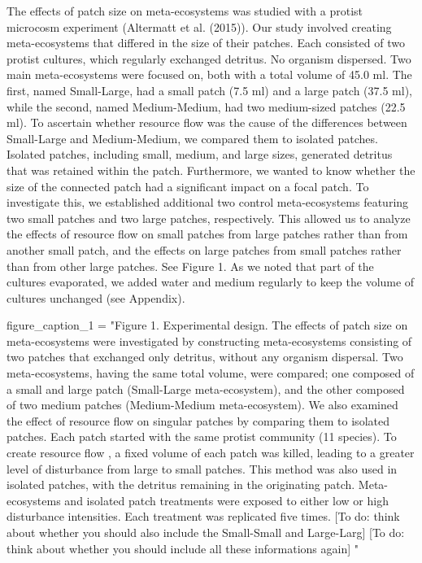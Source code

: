 \documentclass[
]{article}
\newenvironment{Shaded}{\begin{snugshade}}{\end{snugshade}}
\newcommand{\NormalTok}[1]{#1}
\newcommand{\OtherTok}[1]{\textcolor[rgb]{0.56,0.35,0.01}{#1}}
\newcommand{\StringTok}[1]{\textcolor[rgb]{0.31,0.60,0.02}{#1}}
\begin{document}
The effects of patch size on meta-ecosystems was studied with a protist
microcosm experiment (Altermatt et al. (2015)). Our study involved
creating meta-ecosystems that differed in the size of their patches.
Each consisted of two protist cultures, which regularly exchanged
detritus. No organism dispersed. Two main meta-ecosystems were focused
on, both with a total volume of 45.0 ml. The first, named Small-Large,
had a small patch (7.5 ml) and a large patch (37.5 ml), while the
second, named Medium-Medium, had two medium-sized patches (22.5 ml). To
ascertain whether resource flow was the cause of the differences between
Small-Large and Medium-Medium, we compared them to isolated patches.
Isolated patches, including small, medium, and large sizes, generated
detritus that was retained within the patch. Furthermore, we wanted to
know whether the size of the connected patch had a significant impact on
a focal patch. To investigate this, we established additional two
control meta-ecosystems featuring two small patches and two large
patches, respectively. This allowed us to analyze the effects of
resource flow on small patches from large patches rather than from
another small patch, and the effects on large patches from small patches
rather than from other large patches. See Figure 1. As we noted that
part of the cultures evaporated, we added water and medium regularly to
keep the volume of cultures unchanged (see Appendix).

\begin{Shaded}
\begin{Highlighting}[]
\NormalTok{figure\_caption\_1 }\OtherTok{=} \StringTok{"Figure 1. Experimental design. The effects of patch size on meta{-}ecosystems were investigated by constructing meta{-}ecosystems consisting of two patches that exchanged only detritus, without any organism dispersal. Two meta{-}ecosystems, having the same total volume, were compared; one composed of a small and large patch (Small{-}Large meta{-}ecosystem), and the other composed of two medium patches (Medium{-}Medium meta{-}ecosystem). We also examined the effect of resource flow  on singular patches by comparing them to isolated patches. Each patch started with the same protist community (11 species). To create resource flow , a fixed volume of each patch was killed, leading to a greater level of disturbance from large to small patches. This method was also used in isolated patches, with the detritus remaining in the originating patch. Meta{-}ecosystems and isolated patch treatments were exposed to either low or high disturbance intensities. Each treatment was replicated five times.}
\StringTok{[To do: think about whether you should also include the Small{-}Small and Large{-}Larg]}
\StringTok{[To do: think about whether you should include all these informations again]}
\StringTok{"}
\end{Highlighting}
\end{Shaded}
\end{document}
